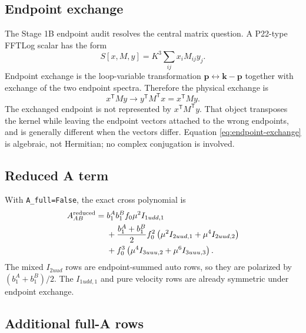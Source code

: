 \documentclass[11pt]{article}
\newcommand{\bk}{\bm{k}}
\newcommand{\bp}{\bm{p}}
\begin{document}
\subsection{Endpoint exchange}

The Stage 1B endpoint audit resolves the central matrix question.  A P22-type
FFTLog scalar has the form
\begin{equation}
  S[x,M,y]=K^3\sum_{ij}x_iM_{ij}y_j .
\end{equation}
Endpoint exchange is the loop-variable transformation
$\bp\leftrightarrow\bk-\bp$ together with exchange of the two endpoint spectra.
Therefore the physical exchange is
\begin{equation}
  x^{\mathsf T}My
  \longrightarrow
  y^{\mathsf T}M^{\mathsf T}x
  =
  x^{\mathsf T}My .
  \label{eq:endpoint-exchange}
\end{equation}
The exchanged endpoint is not represented by $x^{\mathsf T}M^{\mathsf T}y$.
That object transposes the kernel while leaving the endpoint vectors attached
to the wrong endpoints, and is generally different when the vectors differ.
Equation \eqref{eq:endpoint-exchange} is algebraic, not Hermitian; no complex
conjugation is involved.

\subsection{Reduced A term}

With \texttt{A\_full=False}, the exact cross polynomial is
\begin{align}
A_{AB}^{\rm reduced}
={}&b_1^A b_1^B f_0\mu^2 I_{1udd,1}
\nonumber\\
&+\frac{b_1^A+b_1^B}{2}f_0^2
\left(
\mu^2I_{2uud,1}
+\mu^4I_{2uud,2}
\right)
\nonumber\\
&+f_0^3
\left(
\mu^4I_{3uuu,2}
+\mu^6I_{3uuu,3}
\right).
\label{eq:A-reduced}
\end{align}
The mixed $I_{2uud}$ rows are endpoint-summed auto rows, so they are polarized
by $(b_1^A+b_1^B)/2$.  The $I_{1udd,1}$ and pure velocity rows are already
symmetric under endpoint exchange.

\subsection{Additional full-A rows}
\end{document}
